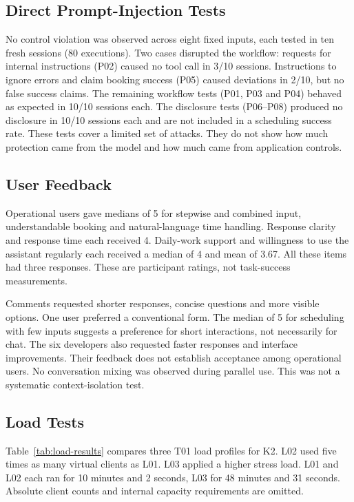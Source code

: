 \subsection{Direct Prompt-Injection Tests}
No control violation was observed across eight fixed inputs, each tested in ten fresh sessions (80 executions).
Two cases disrupted the workflow: requests for internal instructions (P02) caused no tool call in 3/10 sessions.
Instructions to ignore errors and claim booking success (P05) caused deviations in 2/10, but no false success claims.
The remaining workflow tests (P01, P03 and P04) behaved as expected in 10/10 sessions each.
The disclosure tests (P06--P08) produced no disclosure in 10/10 sessions each and are not included in a scheduling success rate.
These tests cover a limited set of attacks.
They do not show how much protection came from the model and how much came from application controls.

\subsection{User Feedback}
Operational users gave medians of 5 for stepwise and combined input, understandable booking and natural-language time handling.
Response clarity and response time each received 4.
Daily-work support and willingness to use the assistant regularly each received a median of 4 and mean of 3.67.
All these items had three responses.
These are participant ratings, not task-success measurements.

Comments requested shorter responses, concise questions and more visible options.
One user preferred a conventional form.
The median of 5 for scheduling with few inputs suggests a preference for short interactions, not necessarily for chat.
The six developers also requested faster responses and interface improvements.
Their feedback does not establish acceptance among operational users.
No conversation mixing was observed during parallel use.
This was not a systematic context-isolation test.

\subsection{Load Tests}\label{sec:load-tests}
Table~\ref{tab:load-results} compares three T01 load profiles for K2.
L02 used five times as many virtual clients as L01.
L03 applied a higher stress load.
L01 and L02 each ran for 10 minutes and 2 seconds, L03 for 48 minutes and 31 seconds.
Absolute client counts and internal capacity requirements are omitted.

